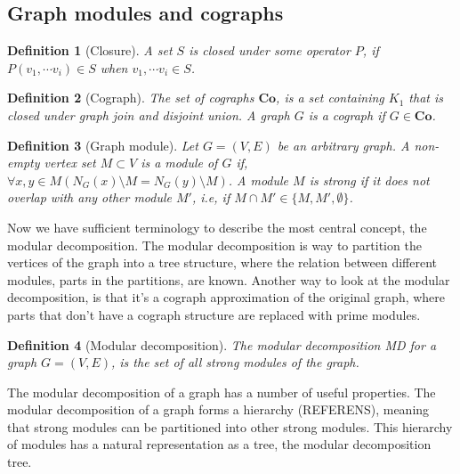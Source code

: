\documentclass[a4paper]{article}
\newtheorem{definition}{Definition}[section]
\begin{document}
\subsection{Graph modules and cographs}
\label{sec:GraphModules}

\begin{definition}[Closure]
    A set $S$ is closed under some operator $P$, if 
    $ P(v_1,\cdots v_i) \in S$ when $v_1,\cdots v_i \in S$.
\end{definition}

\begin{definition}[Cograph]
    The set of cographs $\textbf{Co}$, is a set containing $K_1$ that is closed under 
    graph join and disjoint union. A graph $G$ is a cograph if $G \in \textbf{Co}$.
\end{definition}


\begin{definition}[Graph module]
    Let $G = (V,E)$ be an arbitrary graph. A non-empty vertex set $M \subset V$
    is a module of $G$ if, $\forall x,y \in M (N_G(x) \setminus M = N_G(y) \setminus M)  $. A module $M$ is
    strong if it does not overlap with any other module $M'$, i.e, if 
    $M \cap M' \in \{M,M',\emptyset \}$.
\end{definition}
  

Now we have sufficient terminology to describe the most central concept, the
modular decomposition. The modular decomposition is way to partition the
vertices of the graph into a tree structure, where the relation between
different modules, parts in the partitions, are known. Another way to look at
the modular decomposition, is that it's a cograph approximation of the original
graph, where parts that don't have a cograph structure are replaced with prime
modules.

\begin{definition}[Modular decomposition]
    The modular decomposition MD for a graph $G =(V,E)$, is the set of all
    strong modules of the graph.
\end{definition}

The modular decomposition of a graph has a number of useful properties. The
modular decomposition of a graph forms a hierarchy (REFERENS), meaning that strong modules
can be partitioned into other strong modules. This hierarchy of modules has a
natural representation as a tree, the modular decomposition tree.
\end{document}
